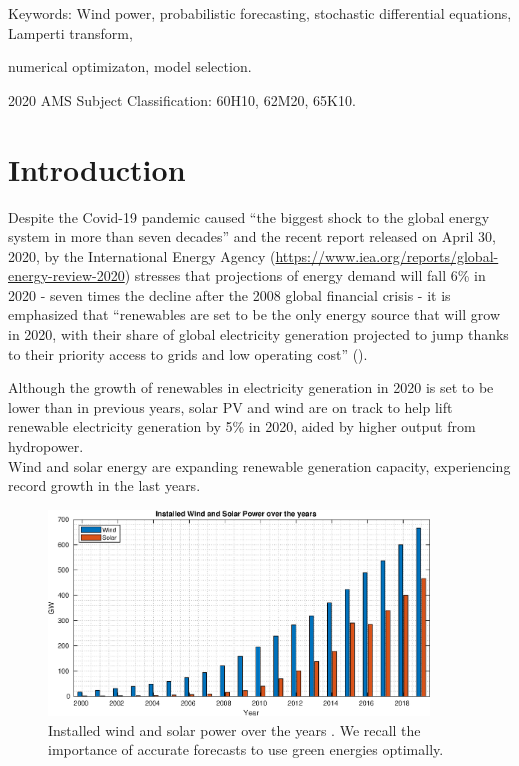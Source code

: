 \documentclass[11pt]{article}
\theoremstyle{definition}
\begin{document}
Keywords: Wind power, probabilistic forecasting, stochastic differential equations, Lamperti transform, 

numerical optimizaton, model selection.

2020 AMS Subject Classification: 60H10, 62M20, 65K10.



\section{Introduction}  \label{Section_1}

Despite the Covid-19 pandemic caused ``the biggest shock to the global energy system in more than seven decades'' and the recent report released on April 30, 2020, by the International Energy Agency (\url{https://www.iea.org/reports/global-energy-review-2020}) stresses that projections of energy demand will fall 6\% in 2020 - seven times the decline after the 2008 global financial crisis - it is emphasized that ``renewables are set to be the only energy source that will grow in 2020, with their share of global electricity generation projected to jump thanks to their priority access to grids and low operating cost'' (\cite{IEA}). 

Although the growth of renewables in electricity generation in 2020 is set to be lower than in previous years,  solar PV and wind are on track to help lift renewable electricity generation by 5\% in 2020, aided by higher output from hydropower. \\

Wind and solar energy are expanding renewable generation capacity, experiencing record growth in the last years.

\begin{figure}[H]
\centering
\includegraphics[width=0.9\textwidth]{plots/wind_and_solar/plot_over_years.eps}
\caption{Installed wind and solar power over the years \cite{sultana2017review}. We recall the importance of accurate forecasts to use green energies optimally.}
\end{figure}
\end{document}
